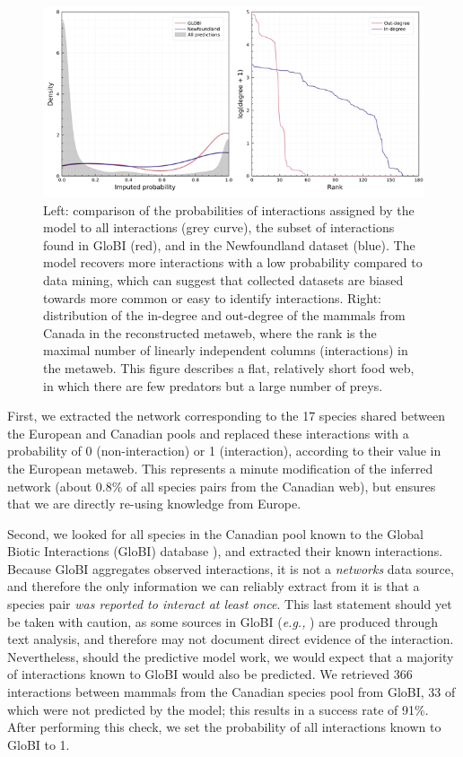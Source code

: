 \begin{refsection}
\begin{figure}[h]
    \centering
    \includegraphics[width=\textwidth]{figures/figure-validation.png}
    \caption{Left: comparison of the probabilities of interactions assigned
by the model to all interactions (grey curve), the subset of
interactions found in GloBI (red), and in the \cite{Strong2014Impact}
Newfoundland dataset (blue). The model recovers more interactions with a
low probability compared to data mining, which can suggest that
collected datasets are biased towards more common or easy to identify
interactions. Right: distribution of the in-degree and out-degree of the
mammals from Canada in the reconstructed metaweb, where the rank is the
maximal number of linearly independent columns (interactions) in the
metaweb. This figure describes a flat, relatively short food web, in
which there are few predators but a large number of
preys.}
    \label{fig:inflation}
\end{figure}

First, we extracted the network corresponding to the 17 species shared
between the European and Canadian pools and replaced these interactions
with a probability of 0 (non-interaction) or 1 (interaction), according
to their value in the European metaweb. This represents a minute
modification of the inferred network (about 0.8\% of all species pairs
from the Canadian web), but ensures that we are directly re-using
knowledge from Europe.

Second, we looked for all species in the Canadian pool known to the
Global Biotic Interactions (GloBI) database \cite{Poelen2014Global}), and
extracted their known interactions. Because GloBI aggregates observed
interactions, it is not a \emph{networks} data source, and therefore the
only information we can reliably extract from it is that a species pair
\emph{was reported to interact at least once}. This last statement
should yet be taken with caution, as some sources in GloBI (\emph{e.g.,}
\cite{Thessen2014Knowledge}) are produced through text analysis, and therefore
may not document direct evidence of the interaction. Nevertheless,
should the predictive model work, we would expect that a majority of
interactions known to GloBI would also be predicted. We retrieved 366
interactions between mammals from the Canadian species pool from GloBI,
33 of which were not predicted by the model; this results in a success
rate of 91\%. After performing this check, we set the probability of all
interactions known to GloBI to 1.


\end{refsection}
